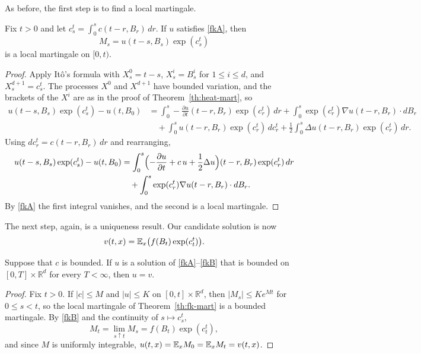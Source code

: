 As before, the first step is to find a local martingale.

\begin{theorem}\label{th:fk-mart}
	Fix $t>0$ and let $c^t_s = \int_0^s c(t-r,B_r)\,dr$. If $u$ satisfies
	\ref{fkA}, then
	\[
		M_s = u(t-s,B_s)\exp(c^t_s)
	\]
	is a local martingale on $[0,t)$.
\end{theorem}
\begin{proof}
	Apply Itô's formula with $X^0_s = t-s$, $X^i_s = B^i_s$ for
	$1\leqslant i\leqslant d$, and $X^{d+1}_s = c^t_s$. The processes $X^0$
	and $X^{d+1}$ have bounded variation, and the brackets of the $X^i$ are as in
	the proof of Theorem~\ref{th:heat-mart}, so
	\begin{align*}
		u(t-s,B_s)\exp(c^t_s) - u(t,B_0)
		 & = \int_0^s -\frac{\partial u}{\partial t}(t-r,B_r)\exp(c^t_r)\,dr
		+ \int_0^s\exp(c^t_r)\nabla u(t-r,B_r)\cdot dB_r                       \\
		 & \quad + \int_0^s u(t-r,B_r)\exp(c^t_r)\,dc^t_r
		+ \frac{1}{2}\int_0^s\Delta u(t-r,B_r)\exp(c^t_r)\,dr .
	\end{align*}
	Using $dc^t_r = c(t-r,B_r)\,dr$ and rearranging,
	\begin{align*}
		u(t-s,B_s)\exp(c^t_s) - u(t,B_0)
		 & = \int_0^s\Bigl(-\frac{\partial u}{\partial t} + c\,u
		+ \frac{1}{2}\Delta u\Bigr)(t-r,B_r)\exp(c^t_r)\,dr                     \\
		 & \quad + \int_0^s\exp(c^t_r)\nabla u(t-r,B_r)\cdot dB_r .
	\end{align*}
	By \ref{fkA} the first integral vanishes, and the second is a local
	martingale.
\end{proof}

The next step, again, is a uniqueness result. Our candidate solution is now
\[
	v(t,x) = \mathbb{E}_x\bigl(f(B_t)\exp(c^t_t)\bigr).
\]

\begin{theorem}\label{th:fk-unique}
	Suppose that $c$ is bounded. If $u$ is a solution of \ref{fkA}--\ref{fkB}
	that is bounded on $[0,T]\times\mathbb{R}^d$ for every $T<\infty$, then
	$u = v$.
\end{theorem}
\begin{proof}
	Fix $t>0$. If $|c|\leqslant M$ and $|u|\leqslant K$ on
	$[0,t]\times\mathbb{R}^d$, then $|M_s|\leqslant Ke^{Mt}$ for
	$0\leqslant s<t$, so the local martingale of Theorem~\ref{th:fk-mart} is a
	bounded martingale. By \ref{fkB} and the continuity of $s\mapsto c^t_s$,
	\[
		M_t = \lim_{s\uparrow t}M_s = f(B_t)\exp(c^t_t),
	\]
	and since $M$ is uniformly integrable,
	$u(t,x) = \mathbb{E}_x M_0 = \mathbb{E}_x M_t = v(t,x)$.
\end{proof}

